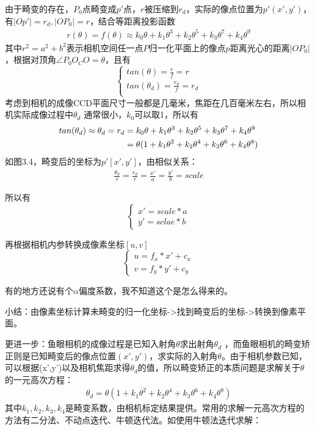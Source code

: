 \documentclass[40pt,a4paper，UTF8]{ctexart}
\numberwithin{equation}{section}
\begin{document}
由于畸变的存在，$P_0$点畸变成$p'$点，$r$被压缩到$r_d$，实际的像点位置为$p'(x',y')$，有$|Op'|=r_d,|OP_0|=r$，结合等距离投影函数
\begin{align}
r(\theta)=f(\theta)\approx k_0\theta + k_1 \theta^3 + k_2\theta^5 + k_3\theta^7 + k_4\theta^9
\end{align}
其中$r^2=a^2+b^2$表示相机空间任一点$P$归一化平面上的像点$p$距离光心的距离$|OP_0|$，根据对顶角$\angle{P_0O_CO}=\theta$，且有
\begin{equation}
\left\{
\begin{array}{l}
tan(\theta)=\frac{r}{f}=r\\
tan(\theta_d)=\frac{r_d}{f}=r_d\\
\end{array}
\right.
\end{equation}
考虑到相机的成像CCD平面尺寸一般都是几毫米，焦距在几百毫米左右，所以相机实际成像过程中$\theta_d$ 通常很小，$k_0$可以取1，所以有
\begin{align}
tan(\theta_d)\approx \theta_d=r_d
&= k_0\theta + k_1 \theta^3 + k_2\theta^5 + k_3\theta^7 + k_4\theta^9 \notag \\
&= \theta(1+k_1\theta^2+k_2 \theta^4+k_3\theta^6+k_4\theta^8)
\end{align}
如图3.4，畸变后的坐标为$p'[x',y']$，由相似关系：
\begin{align}
\frac{\theta_d}{r}=\frac{r_d}{r}=\frac{x'}{a}=\frac{y'}{b}=scale
\end{align}

所以有
\begin{equation}
\left\{
\begin{array}{l}
x'=scale*a\\ 
y'=sclae * b
\end{array}
\right.
\end{equation}

再根据相机内参转换成像素坐标$[u,v]$
\begin{equation}
\left\{
\begin{array}{l}
u = f_x * x' + c_x\\
v = f_y * y' + c_y
\end{array}
\right.
\end{equation}

有的地方还说有个$\alpha$偏度系数，我不知道这个是怎么得来的。

小结：由像素坐标计算未畸变的归一化坐标->找到畸变后的坐标->转换到像素平面。

更进一步：鱼眼相机的成像过程是已知入射角$\theta$求出射角$\theta_d$
，而鱼眼相机的畸变矫正则是已知畸变后的像点位置$(x',y')$，求实际的入射角$\theta$。由于相机参数已知，可以根据(x',y')以及相机焦距求得$\theta_d$的值，所以畸变矫正的本质问题是求解关于$\theta$的一元高次方程：
\begin{align}
\theta_d = \theta(1+k_1\theta^2+k_2\theta^4+k_3\theta^6+k_4\theta^8)
\end{align}
其中$k_1,k_2,k_3,k_4$是畸变系数，由相机标定结果提供。常用的求解一元高次方程的方法有二分法、不动点迭代、牛顿迭代法。如使用牛顿法迭代求解：
\end{document}
